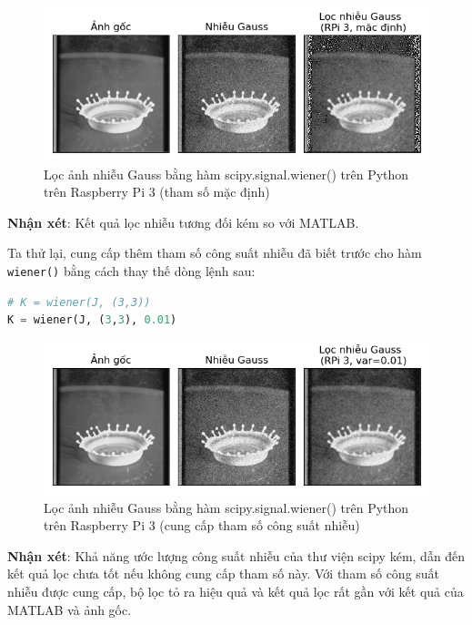 \begin{figure}[H]
    \centering
    \includegraphics[width=1\linewidth]{images/gaussian_denoise_rpi3_default.png}
    \caption{Lọc ảnh nhiễu Gauss bằng hàm scipy.signal.wiener() trên Python trên Raspberry Pi 3 (tham số mặc định)}
    \label{fig:gaussian_denoise_rpi3_default}
\end{figure}

\textbf{Nhận xét}: Kết quả lọc nhiễu tương đối kém so với MATLAB.

Ta thử lại, cung cấp thêm tham số công suất nhiễu đã biết trước cho hàm \texttt{wiener()} bằng cách thay thế dòng lệnh sau:

\begin{lstlisting}[language=Python]
# K = wiener(J, (3,3))
K = wiener(J, (3,3), 0.01)
\end{lstlisting}

\begin{figure}[H]
    \centering
    \includegraphics[width=1\linewidth]{images/gaussian_denoise_rpi3_var0p01.png}
    \caption{Lọc ảnh nhiễu Gauss bằng hàm scipy.signal.wiener() trên Python trên Raspberry Pi 3 (cung cấp tham số công suất nhiễu)}
    \label{fig:enter-label}
\end{figure}

\textbf{Nhận xét}: Khả năng ước lượng công suất nhiễu của thư viện scipy kém, dẫn đến kết quả lọc chưa tốt nếu không cung cấp tham số này. Với tham số công suất nhiễu được cung cấp, bộ lọc tỏ ra hiệu quả và kết quả lọc rất gần với kết quả của MATLAB và ảnh gốc.